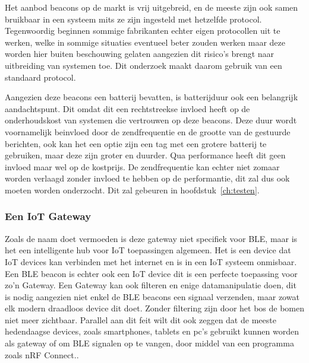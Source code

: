Het aanbod beacons op de markt is vrij uitgebreid, en de meeste zijn ook samen bruikbaar in een systeem mits ze zijn ingesteld met hetzelfde protocol. Tegenwoordig beginnen sommige fabrikanten echter eigen protocollen uit te werken, welke in sommige situaties eventueel beter zouden werken maar deze worden hier buiten beschouwing gelaten aangezien dit risico's brengt naar uitbreiding van systemen toe. Dit onderzoek maakt daarom gebruik van een standaard protocol.

Aangezien deze beacons een batterij bevatten, is batterijduur ook een belangrijk aandachtspunt. Dit omdat dit een rechtstreekse invloed heeft op de onderhoudskost van systemen die vertrouwen op deze beacons. Deze duur wordt voornamelijk beinvloed door de zendfrequentie en de grootte van de gestuurde berichten, ook kan het een optie zijn een tag met een grotere batterij te gebruiken, maar deze zijn groter en duurder. Qua performance heeft dit geen invloed maar wel op de kostprijs. De zendfrequentie kan echter niet zomaar worden verlaagd zonder invloed te hebben op de performantie, dit zal dus ook moeten worden onderzocht. Dit zal gebeuren in hoofdstuk~\ref{ch:testen}.

\subsubsection{Een IoT Gateway}
Zoals de naam doet vermoeden is deze gateway niet specifiek voor BLE, maar is het een intelligente hub voor IoT toepassingen algemeen. Het is een device dat IoT devices kan verbinden met het internet en is in een IoT systeem onmisbaar. Een BLE beacon is echter ook een IoT device dit is een perfecte toepassing voor zo'n Gateway.\autocite{MultiTech2022} Een Gateway kan ook filteren en enige datamanipulatie doen, dit is nodig aangezien niet enkel de BLE beacons een signaal verzenden, maar zowat elk modern draadloos device dit doet. Zonder filtering zijn door het bos de bomen niet meer zichtbaar. Parallel aan dit feit wilt dit ook zeggen dat de meeste hedendaagse devices, zoals smartphones, tablets en pc's gebruikt kunnen worden als gateway of om BLE signalen op te vangen, door middel van een programma zoals nRF Connect.\autocite{Semiconductor2022}.

